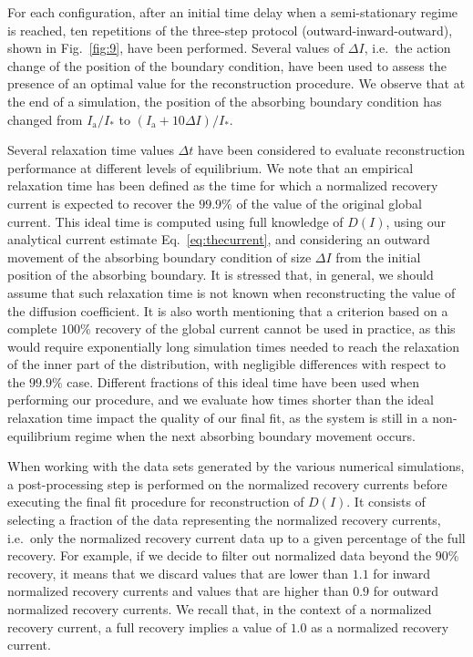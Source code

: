 For each configuration, after an initial time delay when a semi-stationary regime is reached, ten repetitions of the three-step protocol (outward-inward-outward), shown in Fig.~\ref{fig:9}, have been performed. Several values of $\Delta I$, i.e.\ the action change of the position of the boundary condition, have been used to assess the presence of an optimal value for the reconstruction procedure. We observe that at the end of a simulation, the position of the absorbing boundary condition has changed from $I_\mathrm{a}/I_\ast$ to $(I_\mathrm{a} + 10\Delta I) / I_\ast$. 

Several relaxation time values $\Delta t$ have been considered to evaluate reconstruction performance at different levels of equilibrium. We note that an empirical relaxation time has been defined as the time for which a normalized recovery current is expected to recover the $99.9\%$ of the value of the original global current. This ideal time is computed using full knowledge of $D(I)$, using our analytical current estimate Eq.~\eqref{eq:thecurrent}, and considering an outward movement of the absorbing boundary condition of size $\Delta I$ from the initial position of the absorbing boundary. It is stressed that, in general, we should assume that such relaxation time is not known when reconstructing the value of the diffusion coefficient. It is also worth mentioning that a criterion based on a complete $100\%$ recovery of the global current cannot be used in practice, as this would require exponentially long simulation times needed to reach the relaxation of the inner part of the distribution, with negligible differences with respect to the $99.9\%$ case. Different fractions of this ideal time have been used when performing our procedure, and we evaluate how times shorter than the ideal relaxation time impact the quality of our final fit, as the system is still in a non-equilibrium regime when the next absorbing boundary movement occurs.

When working with the data sets generated by the various numerical simulations, a post-processing step is performed on the normalized recovery currents before executing the final fit procedure for reconstruction of $D(I)$. It consists of selecting a fraction of the data representing the normalized recovery currents, i.e.\ only the normalized recovery current data up to a given percentage of the full recovery. For example, if we decide to filter out normalized data beyond the $90\%$ recovery, it means that we discard values that are lower than $1.1$ for inward normalized recovery currents and values that are higher than $0.9$ for outward normalized recovery currents. We recall that, in the context of a normalized recovery current, a full recovery implies a value of $1.0$ as a normalized recovery current.

